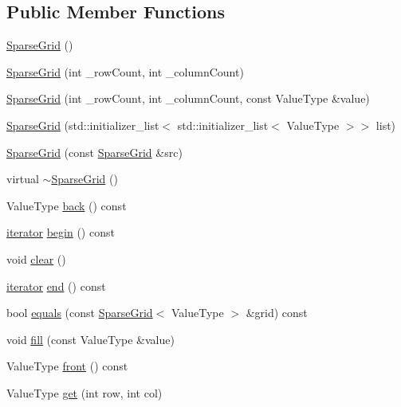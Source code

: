 \subsection*{Public Member Functions}
\begin{DoxyCompactItemize}
\item 
\mbox{\hyperlink{classSparseGrid_aa3e62bd1aaaaaa299dd7679cf577c1bd}{Sparse\+Grid}} ()
\item 
\mbox{\hyperlink{classSparseGrid_a7dbe21d498571cd2ecdd49885ddfa434}{Sparse\+Grid}} (int \+\_\+row\+Count, int \+\_\+column\+Count)
\item 
\mbox{\hyperlink{classSparseGrid_afe7c4936ee4b4ca6def7669bed44f8b6}{Sparse\+Grid}} (int \+\_\+row\+Count, int \+\_\+column\+Count, const Value\+Type \&value)
\item 
\mbox{\hyperlink{classSparseGrid_adf2b22e1fcbb72f3fb90cff8a18dcbd0}{Sparse\+Grid}} (std\+::initializer\+\_\+list$<$ std\+::initializer\+\_\+list$<$ Value\+Type $>$$>$ list)
\item 
\mbox{\hyperlink{classSparseGrid_a6962f2939ac810b43b2e4b31fda92cc0}{Sparse\+Grid}} (const \mbox{\hyperlink{classSparseGrid}{Sparse\+Grid}} \&src)
\item 
virtual \mbox{\hyperlink{classSparseGrid_a833c6d823380fd8995407d94bde29a5d}{$\sim$\+Sparse\+Grid}} ()
\item 
Value\+Type \mbox{\hyperlink{classSparseGrid_a38cbd80c93f450dc9bf3ca7c6a6220bd}{back}} () const
\item 
\mbox{\hyperlink{classSparseGrid_1_1iterator}{iterator}} \mbox{\hyperlink{classSparseGrid_a0c62c15c8ed609e7e5e9518cf5f5c712}{begin}} () const
\item 
void \mbox{\hyperlink{classSparseGrid_ac8bb3912a3ce86b15842e79d0b421204}{clear}} ()
\item 
\mbox{\hyperlink{classSparseGrid_1_1iterator}{iterator}} \mbox{\hyperlink{classSparseGrid_a68b688a51bd0cf6fb5bc2cba292209a8}{end}} () const
\item 
bool \mbox{\hyperlink{classSparseGrid_a900e9c2eb274257965a3d2160c73d9ff}{equals}} (const \mbox{\hyperlink{classSparseGrid}{Sparse\+Grid}}$<$ Value\+Type $>$ \&grid) const
\item 
void \mbox{\hyperlink{classSparseGrid_ac8f8ff1a5d0997596cbedbc2162e4649}{fill}} (const Value\+Type \&value)
\item 
Value\+Type \mbox{\hyperlink{classSparseGrid_abaa174a9d74f7e7e38d4944fa43b5a33}{front}} () const
\item 
Value\+Type \mbox{\hyperlink{classSparseGrid_a49fcb88bae29483f4cb0858f29f6384e}{get}} (int row, int col)
$$
\end{DoxyCompactItemize}
